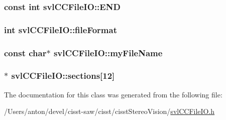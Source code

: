 \subsubsection[{E\+N\+D}]{\setlength{\rightskip}{0pt plus 5cm}const int svl\+C\+C\+File\+I\+O\+::\+E\+N\+D\hspace{0.3cm}{\ttfamily [protected]}}\label{classsvl_c_c_file_i_o_a1684202309d50da31b40dbba082117ff}
\hypertarget{classsvl_c_c_file_i_o_a909643473f103610ef3e3c2f6cc8ab36}{}
\subsubsection[{file\+Format}]{\setlength{\rightskip}{0pt plus 5cm}int svl\+C\+C\+File\+I\+O\+::file\+Format\hspace{0.3cm}{\ttfamily [protected]}}\label{classsvl_c_c_file_i_o_a909643473f103610ef3e3c2f6cc8ab36}
\hypertarget{classsvl_c_c_file_i_o_a35c21bfeb403f11edeaa3cfe840bc131}{}
\subsubsection[{my\+File\+Name}]{\setlength{\rightskip}{0pt plus 5cm}const char$\ast$ svl\+C\+C\+File\+I\+O\+::my\+File\+Name\hspace{0.3cm}{\ttfamily [protected]}}\label{classsvl_c_c_file_i_o_a35c21bfeb403f11edeaa3cfe840bc131}
\hypertarget{classsvl_c_c_file_i_o_a23a716f9d66619a4d6dd8bca942a10e0}{}
\subsubsection[{sections}]{$\ast$ svl\+C\+C\+File\+I\+O\+::sections\mbox{[}12\mbox{]}\hspace{0.3cm}{\ttfamily [protected]}}\label{classsvl_c_c_file_i_o_a23a716f9d66619a4d6dd8bca942a10e0}


The documentation for this class was generated from the following file\+:\begin{DoxyCompactItemize}
\item 
/\+Users/anton/devel/cisst-\/saw/cisst/cisst\+Stereo\+Vision/\hyperlink{svl_c_c_file_i_o_8h}{svl\+C\+C\+File\+I\+O.\+h}\end{DoxyCompactItemize}
